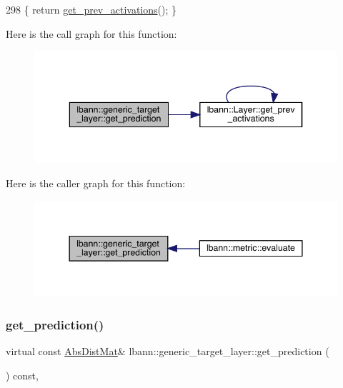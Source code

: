 \begin{DoxyCode}
298 \{ \textcolor{keywordflow}{return} \hyperlink{classlbann_1_1Layer_a45853df73a2e72bfaa774665a0f37ed7}{get\_prev\_activations}(); \}
\end{DoxyCode}
Here is the call graph for this function\+:\nopagebreak
\begin{figure}[H]
\begin{center}
\leavevmode
\includegraphics[width=343pt]{classlbann_1_1generic__target__layer_ac0b88a705256ab06bbba6bbffbc7ebc1_cgraph}
\end{center}
\end{figure}
Here is the caller graph for this function\+:\nopagebreak
\begin{figure}[H]
\begin{center}
\leavevmode
\includegraphics[width=344pt]{classlbann_1_1generic__target__layer_ac0b88a705256ab06bbba6bbffbc7ebc1_icgraph}
\end{center}
\end{figure}
\mbox{\label{classlbann_1_1generic__target__layer_a35de513f32f2db03587623d09ca3d3c9}} 
\subsubsection{\texorpdfstring{get\+\_\+prediction()}{get\_prediction()}\hspace{0.1cm}{\footnotesize\ttfamily [2/2]}}
{\footnotesize\ttfamily virtual const \hyperlink{base_8hpp_a9a697a504ae84010e7439ffec862b470}{Abs\+Dist\+Mat}\& lbann\+::generic\+\_\+target\+\_\+layer\+::get\+\_\+prediction (\begin{DoxyParamCaption}{ }\end{DoxyParamCaption}) const\hspace{0.3cm}{\ttfamily [inline]}, {\ttfamily [virtual]}}




